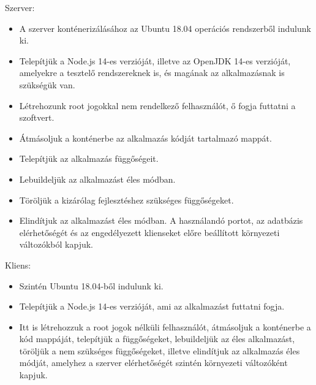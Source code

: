 \documentclass{elteikthesis}
\begin{document}
        Szerver:
        \begin{itemize}
          \setlength\itemsep{-0.5em}
          \item A szerver konténerizálásához az Ubuntu 18.04 operációs rendszerből indulunk ki.
          \item Telepítjük a Node.js 14-es verzióját, illetve az OpenJDK 14-es verzióját, amelyekre a tesztelő rendszereknek is, és magának az alkalmazásnak is szükségük van.
          \item Létrehozunk root jogokkal nem rendelkező felhasználót, ő fogja futtatni a szoftvert.
          \item Átmásoljuk a konténerbe az alkalmazás kódját tartalmazó mappát.
          \item Telepítjük az alkalmazás függőségeit.
          \item Lebuildeljük az alkalmazást éles módban.
          \item Töröljük a kizárólag fejlesztéshez szükséges függőségeket.
          \item Elindítjuk az alkalmazást éles módban. A használandó portot, az adatbázis elérhetőségét és az engedélyezett klienseket előre beállított környezeti változókból kapjuk.
        \end{itemize}

        Kliens:
        \begin{itemize}
          \setlength\itemsep{-0.5em}
          \item Szintén Ubuntu 18.04-ből indulunk ki.
          \item Telepítjük a Node.js 14-es verzióját, ami az alkalmazást futtatni fogja.
          \item Itt is létrehozzuk a root jogok nélküli felhasználót, átmásoljuk a konténerbe a kód mappáját, telepítjük a függőségeket, lebuildeljük az éles alkalmazást, töröljük a nem szükséges függőségeket, illetve elindítjuk az alkalmazás éles módját, amelyhez a szerver elérhetőségét szintén környezeti változóként kapjuk.
        \end{itemize}
\end{document}
